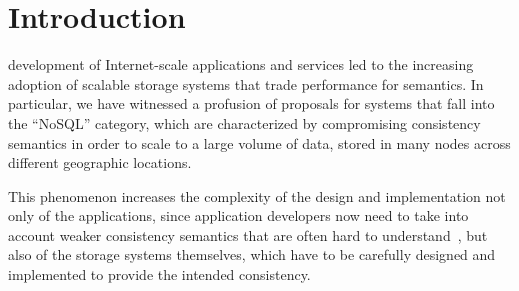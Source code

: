 \documentclass[conference]{IEEEtran}
\begin{document}
	
	\maketitle
	
	
	
	\IEEEpeerreviewmaketitle
	
	
	
	\section{Introduction}\label{sec:intro}%
	
	 development of Internet-scale applications and services led to the increasing adoption of scalable storage systems that trade performance for semantics. In particular, we have witnessed a profusion of proposals for  systems that fall into the ``NoSQL'' category, which are characterized by compromising consistency semantics in order to scale to a large volume of data, stored in many nodes across different geographic locations.
	
	
	This phenomenon increases the complexity of the design and implementation not only of the applications, since application developers now need to take into account weaker consistency semantics that are often hard to understand~\cite{Bailis:2015:FCC:2723372.2737784}, but also of the storage systems themselves, which have to be carefully designed and implemented to provide the intended consistency.
	
\end{document}
